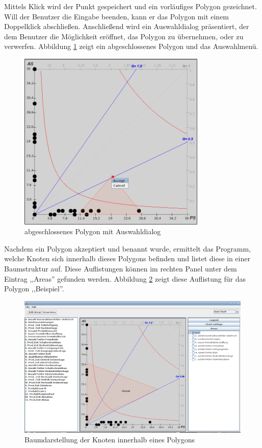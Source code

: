 Mittels Klick wird der Punkt gespeichert und ein vorläufiges Polygon gezeichnet. Will der Benutzer die Eingabe beenden, kann er das Polygon mit einem Doppelklick abschließen. Anschließend wird ein Auswahldialog präsentiert, der dem Benutzer die Möglichkeit eröffnet, das Polygon zu übernehmen, oder zu verwerfen.
Abbildung \ref{menü} zeigt ein abgeschlossenes Polygon und das Auswahlmenü.
\begin{figure}
	\centering
	\includegraphics[width=0.8\textwidth]{pictures/menu.png}
	\caption{abgeschlossenes Polygon mit Auswahldialog}
	\label{menü}
\end{figure}

Nachdem ein Polygon akzeptiert und benannt wurde, ermittelt das Programm, welche Knoten sich innerhalb dieses Polygons befinden und listet diese in einer Baumstruktur auf. Diese Auflistungen können im rechten Panel unter dem Eintrag ,,Areas'' gefunden werden. Abbildung \ref{baum} zeigt diese Auflistung für das Polygon ,,Beispiel''.
\begin{figure}
	\centering
	\includegraphics[width=1\textwidth]{pictures/baum.png}
	\caption{Baumdarstellung der Knoten innerhalb eines Polygons}
	\label{baum}
\end{figure}

